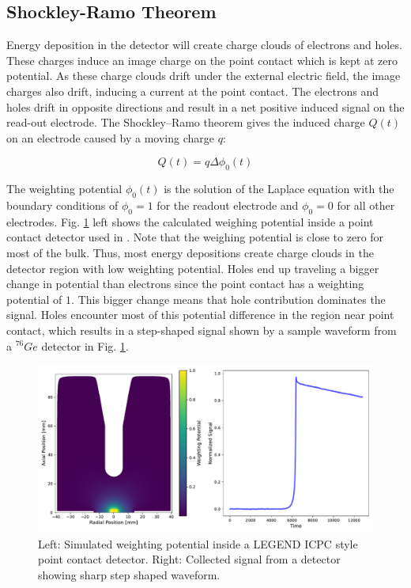 \subsection{Shockley-Ramo Theorem}
Energy deposition in the detector will create charge clouds of electrons and holes. These charges induce an image charge on the point contact which is kept at zero potential. As these charge clouds drift under the external electric field, the image charges also drift, inducing a current at the point contact. The electrons and holes drift in opposite directions and result in a net positive induced signal on the read-out electrode. The Shockley–Ramo theorem gives the induced charge $Q(t)$ on an electrode caused by a moving charge $q$:

\begin{equation}\label{wp_eq}
Q(t)=q\Delta \phi_0(t)
\end{equation}

The weighting potential $\phi_0(t)$ is the solution of the Laplace equation with the boundary conditions of $\phi_0=1$ for the readout electrode and $\phi_0=0$ for all other electrodes. Fig. \ref{fig:wp_signal} left shows the calculated weighing potential inside a point contact detector used in {\MJD}. Note that the weighing potential is close to zero for most of the bulk. Thus, most energy depositions create charge clouds in the detector region with low weighting potential. Holes end up traveling a bigger change in potential than electrons since the point contact has a weighting potential of $1$. This bigger change means that hole contribution dominates the signal. Holes encounter most of this potential difference in the region near point contact, which results in a step-shaped signal shown by a sample waveform from a ${}^{76}Ge$ detector in Fig. \ref{fig:wp_signal}.

  \begin{figure}%
  \centering
  \includegraphics[width=0.99\linewidth]{ch2/figs/wp_det.pdf}
  \caption{Left: Simulated weighting potential inside a LEGEND ICPC style point contact detector. Right: Collected signal from a detector showing sharp step shaped waveform.}
    \label{fig:wp_signal}
  \end{figure}

